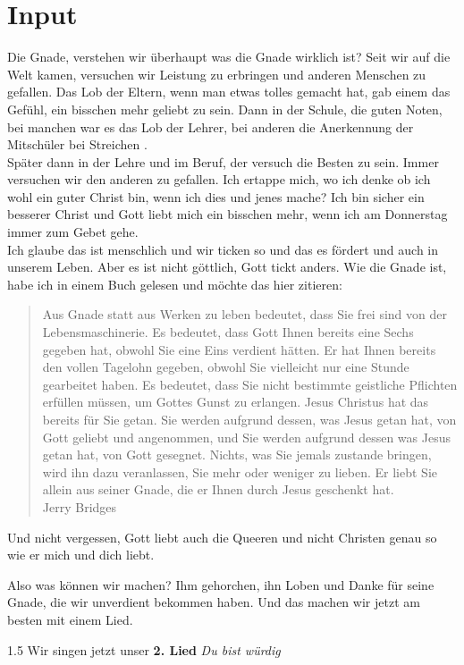 \documentclass[12pt,a4paper]{scrarticle}
\begin{document}
\section{ Input }
\begin{spacing}{1.5}
Die Gnade, verstehen wir überhaupt was die Gnade wirklich ist? Seit wir auf die Welt kamen, versuchen wir Leistung zu erbringen und anderen Menschen zu gefallen. Das Lob der Eltern, wenn man etwas tolles gemacht hat, gab einem das Gefühl, ein bisschen mehr geliebt zu sein. Dann in der Schule, die guten Noten, bei manchen war es das Lob der Lehrer, bei anderen  die Anerkennung der Mitschüler bei Streichen .\\
Später dann in der Lehre und im Beruf, der versuch die Besten zu sein. Immer versuchen wir den anderen zu gefallen. Ich ertappe mich, wo ich denke ob ich wohl ein guter Christ bin, wenn ich dies und jenes mache? Ich bin sicher ein besserer Christ und Gott liebt mich ein bisschen mehr, wenn ich am Donnerstag immer zum Gebet gehe.\\
Ich glaube das ist menschlich und wir ticken so und das es fördert und auch in unserem Leben. Aber es ist nicht göttlich, Gott tickt anders. Wie die Gnade ist, habe ich in einem Buch gelesen und möchte das hier zitieren:
\begin{quote}
    Aus Gnade statt aus Werken zu leben bedeutet, dass Sie frei sind von der Lebensmaschinerie. Es bedeutet, dass Gott Ihnen bereits eine \glqq Sechs\grqq{} gegeben hat, obwohl Sie eine \glqq Eins\grqq{} verdient hätten. Er hat Ihnen bereits den vollen Tagelohn gegeben, obwohl Sie vielleicht nur eine Stunde gearbeitet haben. Es bedeutet, dass Sie nicht bestimmte geistliche Pflichten erfüllen müssen, um Gottes Gunst zu erlangen. Jesus Christus hat das bereits für Sie getan. Sie werden aufgrund dessen, was Jesus getan hat, von Gott geliebt und angenommen, und Sie werden aufgrund dessen was Jesus getan hat, von Gott gesegnet. Nichts, was Sie jemals zustande bringen, wird ihn dazu veranlassen, Sie mehr oder weniger zu lieben. Er liebt Sie allein aus seiner Gnade, die er Ihnen durch Jesus geschenkt hat.\\
    Jerry Bridges
\end{quote}
Und nicht vergessen, Gott liebt auch die Queeren und nicht Christen genau so wie er mich und dich liebt.

Also was können wir machen? Ihm gehorchen, ihn Loben und Danke für seine Gnade, die wir unverdient bekommen haben. Und das machen wir jetzt am besten mit einem Lied.


\end{spacing}{1.5}
Wir singen jetzt unser \textbf{2. Lied} \textit{Du bist würdig}
\end{document}

